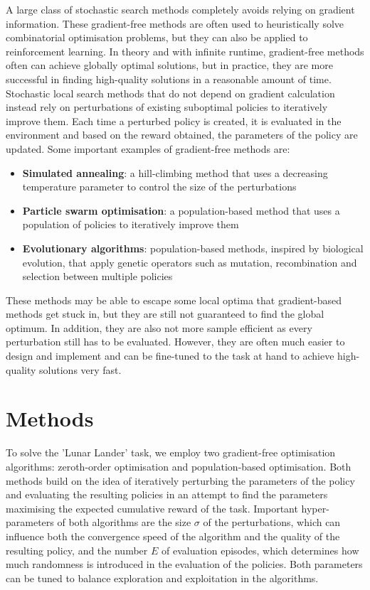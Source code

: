 \documentclass[10pt]{article}
\begin{document}
A large class of stochastic search methods completely avoids relying on gradient
information.
These gradient-free methods are often used to heuristically solve combinatorial
optimisation problems, but they can also be applied to reinforcement learning.
In theory and with infinite runtime, gradient-free methods often can achieve globally
optimal solutions, but in practice, they are more successful in finding high-quality
solutions in a reasonable amount of time.\\
Stochastic local search methods that do not depend on gradient calculation instead rely
on perturbations of existing suboptimal policies to iteratively improve them.
Each time a perturbed policy is created, it is evaluated in the environment and based on
the reward obtained, the parameters of the policy are updated.
Some important examples of gradient-free methods are:
\begin{itemize}
    \item
          \textbf{Simulated annealing}: a hill-climbing method that uses a decreasing temperature
          parameter to control the size of the perturbations
    \item \textbf{Particle swarm
              optimisation}: a population-based method that uses a population of policies to
          iteratively improve them
    \item \textbf{Evolutionary algorithms}: population-based
          methods, inspired by biological evolution, that apply genetic operators such as mutation,
          recombination and selection between multiple policies
\end{itemize} These methods may be
able to escape some local optima that gradient-based methods get stuck in, but they are
still not guaranteed to find the global optimum.
In addition, they are also not more sample efficient as every perturbation still has to
be evaluated.
However, they are often much easier to design and implement and can be fine-tuned to the
task at hand to achieve high-quality solutions very fast.
\cite{HO}

\section{Methods}

To solve the 'Lunar Lander' task, we employ two gradient-free optimisation algorithms:
zeroth-order optimisation and population-based optimisation.
Both methods build on the idea of iteratively perturbing the parameters of the policy and
evaluating the resulting policies in an attempt to find the parameters maximising the
expected cumulative reward of the task.
Important hyper-parameters of both algorithms are the size $\sigma$ of the perturbations,
which can influence both the convergence speed of the algorithm and the quality of the
resulting policy, and the number $E$ of evaluation episodes, which determines how much
randomness is introduced in the evaluation of the policies.
Both parameters can be tuned to balance exploration and exploitation in the algorithms.
\end{document}
